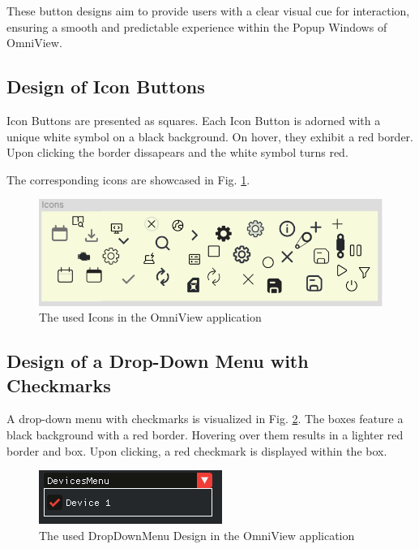 \documentclass[]{scrreprt}
\begin{document}
These button designs aim to provide users with a clear visual cue for interaction, ensuring a smooth and predictable experience within the Popup Windows of OmniView.

\subsection{Design of Icon Buttons}\label{cap:Designprinciples_IconButtons}

Icon Buttons are presented as squares. Each Icon Button is adorned with a unique white symbol on a black background. On hover, they exhibit a red border. Upon clicking the border dissapears and the white symbol turns red. 


The corresponding icons are showcased in Fig. \ref{fig: IconImages}.

\begin{figure}
    \includegraphics[width=.7\textwidth]{assets/pictures/Icons.png}
    \caption[]{The used Icons in the OmniView application}
    \label{fig: IconImages}
\end{figure}



\subsection{Design of a Drop-Down Menu with Checkmarks}\label{cap:Designprinciples_dropDownMenusWithCheckmark}

A drop-down menu with checkmarks is visualized in Fig. \ref{fig: DragandDropwithCheckmarks}. The boxes feature a black background with a red border. Hovering over them results in a lighter red border and box. Upon clicking, a red checkmark is displayed within the box.

\begin{figure}
    \includegraphics[width=.5\textwidth]{assets/pictures/DropDownMenu.png}
    \caption[]{The used DropDownMenu Design in the OmniView application}
    \label{fig: DragandDropwithCheckmarks}
\end{figure}
\end{document}
